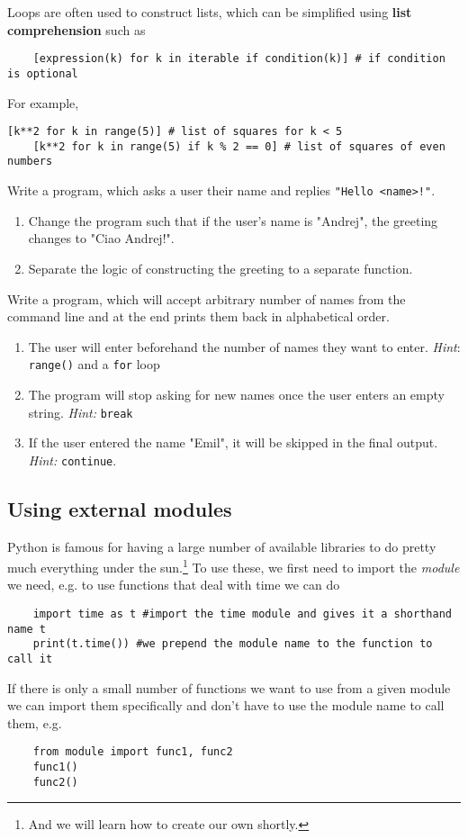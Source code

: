 Loops are often used to construct lists, which can be simplified using \textbf{list comprehension} such as
\begin{lstlisting}
    [expression(k) for k in iterable if condition(k)] # if condition is optional
\end{lstlisting}
For example,
\begin{lstlisting}[caption=List comprehension.]
    [k**2 for k in range(5)] # list of squares for k < 5
    [k**2 for k in range(5) if k % 2 == 0] # list of squares of even numbers
\end{lstlisting}

\begin{exercise}
    Write a program, which asks a user their name and replies \verb|"Hello <name>!"|.
    \begin{enumerate}
        \item Change the program such that if the user's name is "Andrej", the greeting changes to "Ciao Andrej!".
        \item Separate the logic of constructing the greeting to a separate function.
    \end{enumerate}
\end{exercise}
\begin{exercise}
    Write a program, which will accept arbitrary number of names from the command line and at the end prints them back in alphabetical order.
    \begin{enumerate}
        \item The user will enter beforehand the number of names they want to enter. \emph{Hint}: \verb|range()| and a \verb|for| loop
        \item The program will stop asking for new names once the user enters an empty string. \emph{Hint:} \verb|break|
        \item If the user entered the name "Emil", it will be skipped in the final output. \emph{Hint:} \verb|continue|.
    \end{enumerate}
\end{exercise}

\subsection{Using external modules}
Python is famous for having a large number of available libraries to do pretty much everything under the sun.\footnote{And we will learn how to create our own shortly.} To use these, we first need to import the \emph{module} we need, e.g. to use functions that deal with time we can do
\begin{lstlisting}
    import time as t #import the time module and gives it a shorthand name t
    print(t.time()) #we prepend the module name to the function to call it
\end{lstlisting}
If there is only a small number of functions we want to use from a given module we can import them specifically and don't have to use the module name to call them, e.g.
\begin{lstlisting}
    from module import func1, func2
    func1()
    func2()
\end{lstlisting}

